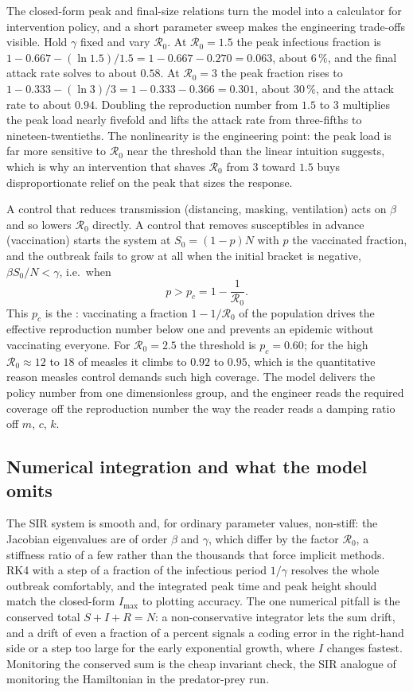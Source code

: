 The closed-form peak and final-size relations turn the model into a
calculator for intervention policy, and a short parameter sweep makes
the engineering trade-offs visible. Hold $\gamma$ fixed and vary
$\mathcal{R}_{0}$. At $\mathcal{R}_{0} = 1.5$ the peak infectious
fraction is $1 - 0.667 - (\ln 1.5)/1.5 = 1 - 0.667 - 0.270 = 0.063$,
about $6\,\%$, and the final attack rate solves to about $0.58$. At
$\mathcal{R}_{0} = 3$ the peak fraction rises to $1 - 0.333 -
(\ln 3)/3 = 1 - 0.333 - 0.366 = 0.301$, about $30\,\%$, and the attack
rate to about $0.94$. Doubling the reproduction number from $1.5$ to
$3$ multiplies the peak load nearly fivefold and lifts the attack rate
from three-fifths to nineteen-twentieths. The nonlinearity is the
engineering point: the peak load is far more sensitive to
$\mathcal{R}_{0}$ near the threshold than the linear intuition
suggests, which is why an intervention that shaves $\mathcal{R}_{0}$
from $3$ toward $1.5$ buys disproportionate relief on the peak that
sizes the response.

A control that reduces transmission (distancing, masking, ventilation)
acts on $\beta$ and so lowers $\mathcal{R}_{0}$ directly. A control
that removes susceptibles in advance (vaccination) starts the system
at $S_{0} = (1 - p) N$ with $p$ the vaccinated fraction, and the
outbreak fails to grow at all when the initial bracket is negative,
$\beta S_{0}/N < \gamma$, i.e.\ when
\[
p > p_{c} = 1 - \frac{1}{\mathcal{R}_{0}}.
\]
This $p_{c}$ is the : vaccinating a
fraction $1 - 1/\mathcal{R}_{0}$ of the population drives the effective
reproduction number below one and prevents an epidemic without
vaccinating everyone. For $\mathcal{R}_{0} = 2.5$ the threshold is
$p_{c} = 0.60$; for the high $\mathcal{R}_{0} \approx 12$ to $18$ of
measles it climbs to $0.92$ to $0.95$, which is the quantitative reason
measles control demands such high coverage. The model delivers the
policy number from one dimensionless group, and the engineer reads the
required coverage off the reproduction number the way the reader reads
a damping ratio off $m$, $c$, $k$.

\subsection{Numerical integration and what the model omits}

The SIR system is smooth and, for ordinary parameter values,
non-stiff: the Jacobian eigenvalues are of order $\beta$ and $\gamma$,
which differ by the factor $\mathcal{R}_{0}$, a stiffness ratio of a
few rather than the thousands that force implicit methods. RK4 with a
step of a fraction of the infectious period $1/\gamma$ resolves the
whole outbreak comfortably, and the integrated peak time and peak
height should match the closed-form $I_{\max}$ to plotting accuracy.
The one numerical pitfall is the conserved total $S + I + R = N$: a
non-conservative integrator lets the sum drift, and a drift of even a
fraction of a percent signals a coding error in the right-hand side or
a step too large for the early exponential growth, where $I$ changes
fastest. Monitoring the conserved sum is the cheap invariant check, the
SIR analogue of monitoring the Hamiltonian in the predator-prey run.

